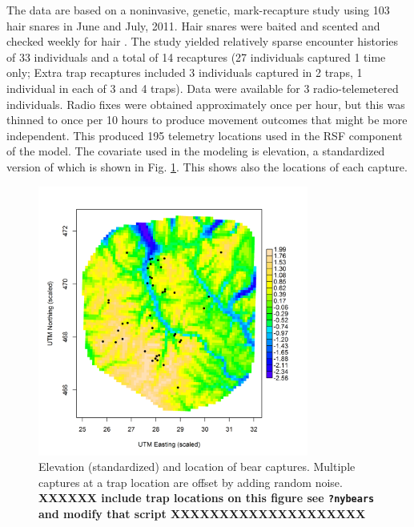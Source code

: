 The data are based on a noninvasive, genetic, mark-recapture study
using 103 hair snares in June and July, 2011.  Hair snares were baited
and scented and checked weekly for hair \citep{sun:2013}.  The study
yielded relatively sparse encounter histories
 of 33 individuals and a total of 14 recaptures (27
individuals captured 1 time only;
 Extra trap recaptures included
3 individuals captured in 2 traps, 1 individual in each of 3 and 4
traps).  Data were available for 3 radio-telemetered individuals.
Radio fixes were obtained approximately once per hour, but this was
thinned to once per 10 hours to produce movement outcomes that might
be more independent. This produced 195 telemetry locations used in the
RSF component of the model.  The covariate used in the modeling is
elevation, a standardized version of which is shown in
Fig. \ref{fig.elevation}. This shows also the locations of each
capture.

\begin{figure}
\centering
\includegraphics[width=3.5in,height=3.5in]{Ch13-RSF/figs/elev_captures2.png}
\caption{
Elevation (standardized) and location of bear captures.
Multiple captures at a trap location are offset by adding
random noise. 
{\bf XXXXXX include trap locations on this figure
see \mbox{\tt ?nybears} and modify that script  XXXXXXXXXXXXXXXXXXXX}
}
\label{fig.elevation}
\end{figure}

